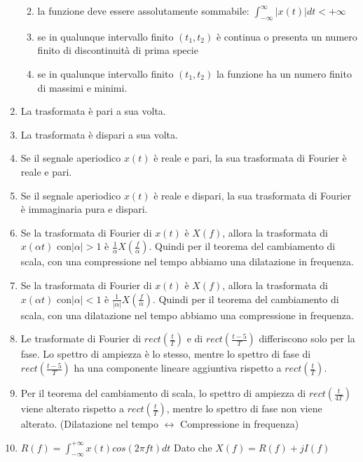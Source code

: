 \documentclass[
  paper=a4,
  ,captions=tableheading
]{scrartcl}
\providecommand{\tightlist}{%
  \setlength{\itemsep}{0pt}\setlength{\parskip}{0pt}}
\begin{document}
\begin{enumerate}
  \begin{enumerate}
  \def\labelenumii{\arabic{enumii}.}
  \tightlist
  \item
    la funzione deve essere assolutamente sommabile:
    \(\displaystyle \int_{-\infty}^{\infty} |x(t)| dt < +\infty\)
  \item
    se in qualunque intervallo finito \((t_1, t_2)\) è continua o
    presenta un numero finito di discontinuità di prima specie
  \item
    se in qualunque intervallo finito \((t_1, t_2)\) la funzione ha un
    numero finito di massimi e minimi.
  \end{enumerate}
\item
  La trasformata è pari a sua volta.
\item
  La trasformata è dispari a sua volta.
\item
  Se il segnale aperiodico \(x(t)\) è reale e pari, la sua trasformata
  di Fourier è reale e pari.
\item
  Se il segnale aperiodico \(x(t)\) è reale e dispari, la sua
  trasformata di Fourier è immaginaria pura e dispari.
\item
  Se la trasformata di Fourier di \(x(t)\) è \(X(f)\), allora la
  trasformata di \(x(\alpha t)\) con\(|\alpha| > 1\) è
  \(\displaystyle \frac{1}{\alpha} X(\frac{f}{\alpha})\). Quindi per il
  teorema del cambiamento di scala, con una compressione nel tempo
  abbiamo una dilatazione in frequenza.
\item
  Se la trasformata di Fourier di \(x(t)\) è \(X(f)\), allora la
  trasformata di \(x(\alpha t)\) con\(|\alpha| < 1\) è
  \(\displaystyle \frac{1}{|\alpha|} X(\frac{f}{\alpha})\). Quindi per
  il teorema del cambiamento di scala, con una dilatazione nel tempo
  abbiamo una compressione in frequenza.
\item
  Le trasformate di Fourier di \(rect (\frac{t}{T})\) e di
  \(rect (\frac{t-5}{T})\) differiscono solo per la fase. Lo spettro di
  ampiezza è lo stesso, mentre lo spettro di fase di
  \(rect (\frac{t-5}{T})\) ha una componente lineare aggiuntiva rispetto
  a \(rect (\frac{t}{T})\).
\item
  Per il teorema del cambiamento di scala, lo spettro di ampiezza di
  \(rect(\frac{t}{4T})\) viene alterato rispetto a
  \(rect(\frac{t}{T})\), mentre lo spettro di fase non viene alterato.
  (Dilatazione nel tempo \(\leftrightarrow\) Compressione in frequenza)
\item
  \(\displaystyle R(f) = \int_{- \infty}^{+\infty} x(t) cos(2\pi ft)dt\)
  Dato che \(\displaystyle X(f) = R(f)+ jI(f)\)

\end{enumerate}
\end{document}
